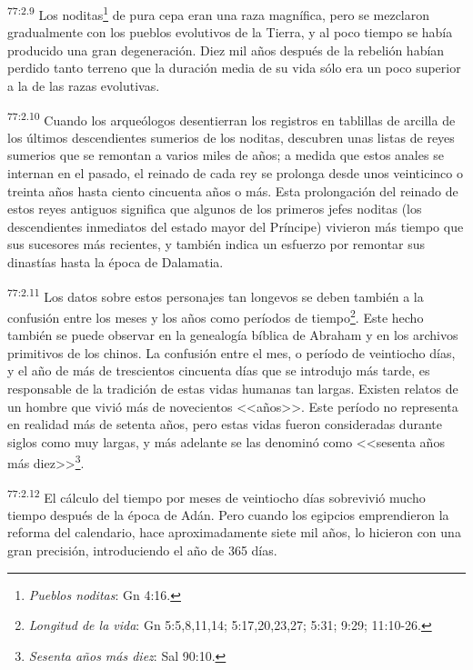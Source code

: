 \par
\textsuperscript{77:2.9} Los noditas\footnote{\textit{Pueblos noditas}: Gn 4:16.} de pura cepa eran una raza magnífica, pero se mezclaron gradualmente con los pueblos evolutivos de la Tierra, y al poco tiempo se había producido una gran degeneración. Diez mil años después de la rebelión habían perdido tanto terreno que la duración media de su vida sólo era un poco superior a la de las razas evolutivas.

\par
\textsuperscript{77:2.10} Cuando los arqueólogos desentierran los registros en tablillas de arcilla de los últimos descendientes sumerios de los noditas, descubren unas listas de reyes sumerios que se remontan a varios miles de años; a medida que estos anales se internan en el pasado, el reinado de cada rey se prolonga desde unos veinticinco o treinta años hasta ciento cincuenta años o más. Esta prolongación del reinado de estos reyes antiguos significa que algunos de los primeros jefes noditas (los descendientes inmediatos del estado mayor del Príncipe) vivieron más tiempo que sus sucesores más recientes, y también indica un esfuerzo por remontar sus dinastías hasta la época de Dalamatia.

\par
\textsuperscript{77:2.11} Los datos sobre estos personajes tan longevos se deben también a la confusión entre los meses y los años como períodos de tiempo\footnote{\textit{Longitud de la vida}: Gn 5:5,8,11,14; 5:17,20,23,27; 5:31; 9:29; 11:10-26.}. Este hecho también se puede observar en la genealogía bíblica de Abraham y en los archivos primitivos de los chinos. La confusión entre el mes, o período de veintiocho días, y el año de más de trescientos cincuenta días que se introdujo más tarde, es responsable de la tradición de estas vidas humanas tan largas. Existen relatos de un hombre que vivió más de novecientos <<años>>. Este período no representa en realidad más de setenta años, pero estas vidas fueron consideradas durante siglos como muy largas, y más adelante se las denominó como <<sesenta años más diez>>\footnote{\textit{Sesenta años más diez}: Sal 90:10.}.

\par
\textsuperscript{77:2.12} El cálculo del tiempo por meses de veintiocho días sobrevivió mucho tiempo después de la época de Adán. Pero cuando los egipcios emprendieron la reforma del calendario, hace aproximadamente siete mil años, lo hicieron con una gran precisión, introduciendo el año de 365 días.

